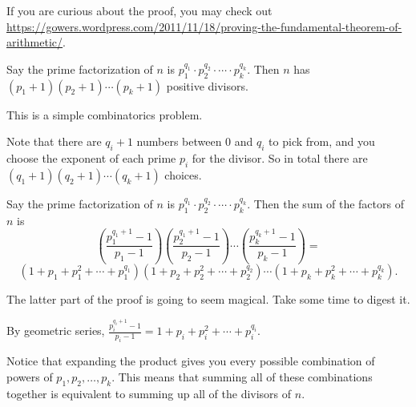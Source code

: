 \documentclass[mast]{lucky}
\begin{document}
If you are curious about the proof, you may check out \url{https://gowers.wordpress.com/2011/11/18/proving-the-fundamental-theorem-of-arithmetic/}.

\begin{theo}
Say the prime factorization of $n$ is $p_1^{q_1}\cdot p_2^{q_2}\cdot\cdots\cdot p_k^{q_k}.$ Then $n$ has $(p_1+1)(p_2+1)\cdots(p_k+1)$ positive divisors.
\end{theo}

\begin{pro}
This is a simple combinatorics problem.

Note that there are $q_i+1$ numbers between $0$ and $q_i$ to pick from, and you choose the exponent of each prime $p_i$ for the divisor. So in total there are $(q_1+1)(q_2+1)\cdots(q_k+1)$ choices.
\end{pro}

\begin{theo}
Say the prime factorization of $n$ is $p_1^{q_1}\cdot p_2^{q_2}\cdot\cdots\cdot p_k^{q_k}.$ Then the sum of the factors of $n$ is
\[\left(\frac{p_1^{q_1+1}-1}{p_1-1}\right)\left(\frac{p_2^{q_1+1}-1}{p_2-1}\right)\cdots\left(\frac{p_k^{q_k+1}-1}{p_k-1}\right)=\]
\[\left(1+p_1+p_1^2+\cdots+p_1^{q_1}\right)\left(1+p_2+p_2^2+\cdots+p_2^{q_2}\right)\cdots\left(1+p_k+p_k^2+\cdots+p_k^{q_k}\right).\]
\end{theo}
The latter part of the proof is going to seem magical. Take some time to digest it.

\begin{pro}
By geometric series, $\frac{p_i^{q_i+1}-1}{p_i-1}=1+p_i+p_i^2+\cdots+p_i^{q_i}.$

Notice that expanding the product gives you every possible combination of powers of $p_1,p_2,\ldots,p_k.$ This means that summing all of these combinations together is equivalent to summing up all of the divisors of $n.$
\end{pro}
\end{document}
